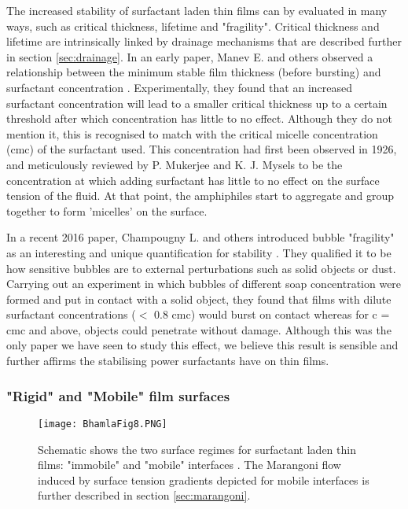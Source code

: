 \documentclass[a4paper,12pt]{article}
\numberwithin{equation}{section}
\numberwithin{figure}{section}
\numberwithin{table}{section}
\begin{document}
The increased stability of surfactant laden thin films can by evaluated in many ways, such as critical thickness, lifetime and "fragility". Critical thickness and lifetime are intrinsically linked by drainage mechanisms that are described further in section \ref{sec:drainage}. In an early paper, Manev E. and others observed a relationship between the minimum stable film thickness (before bursting) and surfactant concentration \cite{Manev1974}. Experimentally, they found that an increased surfactant concentration will lead to a smaller critical thickness up to a certain threshold after which concentration has little to no effect. Although they do not mention it, this is recognised to match with the critical micelle concentration (cmc) of the surfactant used. This concentration had first been observed in 1926, and meticulously reviewed by P. Mukerjee and K. J. Mysels \cite{Mukerjee1971} to be the concentration at which adding surfactant has little to no effect on the surface tension of the fluid. At that point, the amphiphiles start to aggregate and group together to form 'micelles' on the surface. %

In a recent 2016 paper, Champougny L. and others introduced bubble "fragility" as an interesting and unique quantification for stability \cite{ChampougnyNotBare2016}. They qualified it to be how sensitive bubbles are to external perturbations such as solid objects or dust. Carrying out an experiment in which bubbles of different soap concentration were formed and put in contact with a solid object, they found that films with dilute surfactant concentrations ($<$ 0.8 cmc) would burst on contact whereas for c = cmc and above, objects could penetrate without damage. Although this was the only paper we have seen to study this effect, we believe this result is sensible and further affirms the stabilising power surfactants have on thin films.


\subsubsection{"Rigid" and "Mobile" film surfaces}
\label{sec:RigidMobile}

\begin{figure}[!htbp]
    \centering
    \captionsetup{width=.9\linewidth}
    \texttt{[image: BhamlaFig8.PNG]}
    \caption{Schematic shows the two surface regimes for surfactant laden thin films: "immobile" and "mobile" interfaces \cite{Bhamla2017}. The Marangoni flow induced by surface tension gradients depicted for mobile interfaces is further described in section \ref{sec:marangoni}.}
    \label{fig:Bhamla8}
\end{figure}
\end{document}
